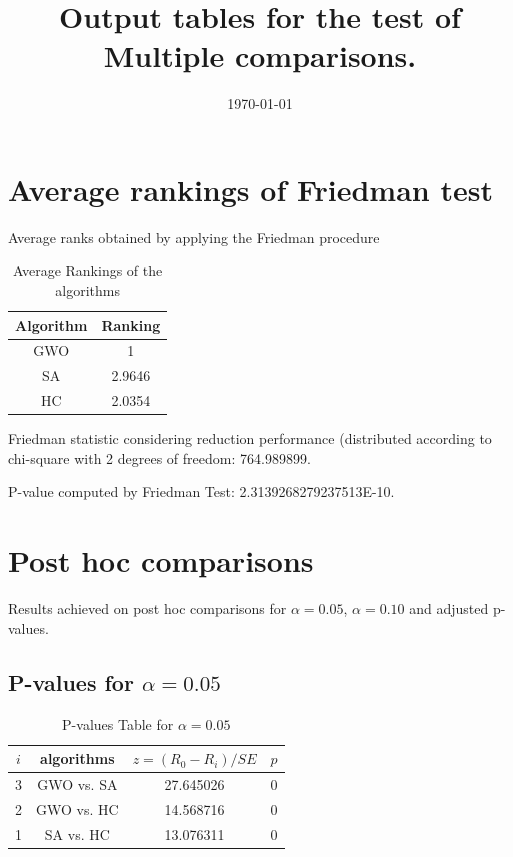 \documentclass[a4paper,10pt]{article}
\title{Output tables for the test of Multiple comparisons.}
\author{}
\date{\today}
\begin{document}
\begin{landscape}
\pagestyle{empty}
\maketitle
\thispagestyle{empty}
\section{Average rankings of Friedman test}



Average ranks obtained by applying the Friedman procedure

\begin{table}[!htp]
\centering
\begin{tabular}{|c|c|}\hline
Algorithm&Ranking\\\hline
GWO & 1\\
SA & 2.9646\\
HC & 2.0354\\
\hline
\end{tabular}
\caption{Average Rankings of the algorithms}
\end{table}

Friedman statistic considering reduction performance (distributed according to chi-square with 2 degrees of freedom: 764.989899.

P-value computed by Friedman Test: 2.3139268279237513E-10.\newline



\pagebreak

\section{Post hoc comparisons}

Results achieved on post hoc comparisons for $\alpha = 0.05$, $\alpha = 0.10$ and adjusted p-values.

\subsection{P-values for $\alpha=0.05$}

\begin{table}[!htp]
\centering\scriptsize
\begin{tabular}{cccc}
$i$&algorithms&$z=(R_0 - R_i)/SE$&$p$\\
\hline3&GWO vs. SA&27.645026&0\\
2&GWO vs. HC&14.568716&0\\
1&SA vs. HC&13.076311&0\\
\hline
\end{tabular}
\caption{P-values Table for $\alpha=0.05$}
\end{table}\pagebreak


\end{landscape}
\end{document}
